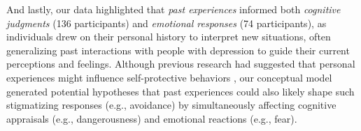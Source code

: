

And lastly, our data highlighted that \textit{past experiences} informed both \textit{cognitive judgments} (136 participants) and \textit{emotional responses} (74 participants), as individuals drew on their personal history to interpret new situations, often generalizing past interactions with people with depression to guide their current perceptions and feelings. 
Although previous research had suggested that personal experiences might influence self-protective behaviors \cite{experience_weinstein_1989}, our conceptual model generated potential hypotheses that past experiences could also likely shape such stigmatizing responses (e.g., avoidance) by simultaneously affecting cognitive appraisals (e.g., dangerousness) and emotional reactions (e.g., fear).




